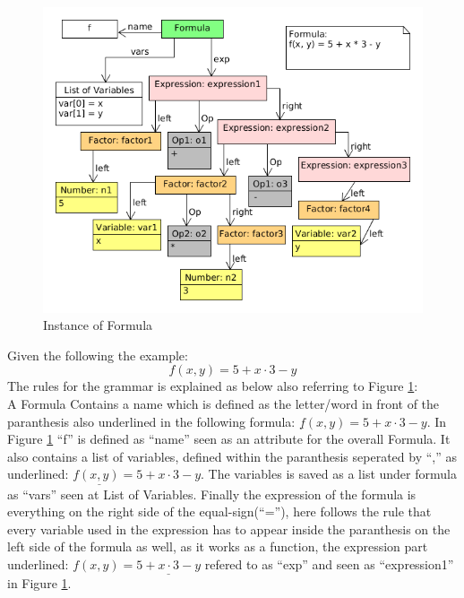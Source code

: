 \begin{figure}
  \begin{center}
    \includegraphics[width=\linewidth]{images/formulaInstance}
  \end{center}
  \caption{Instance of Formula}
  \label{fig:formulaInstance}
\end{figure}

Given the following the example: $$f(x, y) = 5 + x \cdot 3 - y$$
The rules for the grammar is explained as below also referring to
Figure \ref{fig:formulaInstance}:
\\
A Formula Contains a name which is defined as the letter/word in front of the paranthesis
also underlined in the following formula: $\underline{f}(x, y) = 5 + x \cdot 3 - y$.
In Figure \ref{fig:formulaInstance} ``f'' is defined as ``name'' seen as an attribute
for the overall Formula.
It also contains a list of variables, defined within the paranthesis seperated
by ``,'' as underlined: $f\underline{(x, y)} = 5 + x \cdot 3 - y$. The variables is saved
as a list under formula as ``vars'' seen at List of Variables.
Finally the expression of the formula is everything on the right side of the equal-sign(``=''),
here follows the rule that every variable used in the expression has to appear inside
the paranthesis on the left side of the formula as well, as it works as a function,
the expression part underlined: $f(x, y) = \underline{5 + x \cdot 3 - y}$ refered to
as ``exp'' and seen as ``expression1'' in Figure \ref{fig:formulaInstance}. 

